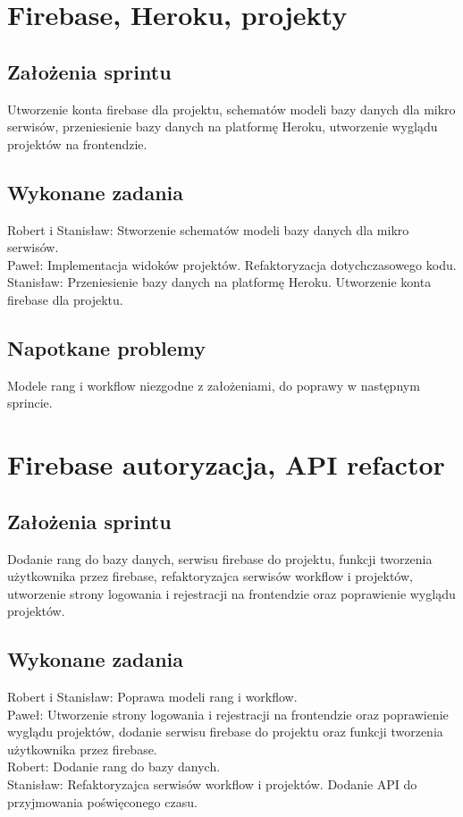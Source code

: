 \documentclass[a4paper,11pt]{report}
\begin{document}
\section {Firebase, Heroku, projekty}
\subsection {Założenia sprintu}
Utworzenie konta firebase dla projektu, schematów modeli bazy danych dla mikro serwisów, przeniesienie bazy danych na platformę Heroku, utworzenie wyglądu projektów na frontendzie.
\subsection {Wykonane zadania}
Robert i Stanisław: Stworzenie schematów modeli bazy danych dla mikro serwisów.\\
Paweł: Implementacja widoków projektów. Refaktoryzacja dotychczasowego kodu. \\
Stanisław: Przeniesienie bazy danych na platformę Heroku. Utworzenie konta firebase dla projektu.\\
\subsection {Napotkane problemy}
Modele rang i workflow niezgodne z założeniami, do poprawy w następnym sprincie.

\section {Firebase autoryzacja, API refactor}
\subsection {Założenia sprintu}
Dodanie rang do bazy danych, serwisu firebase do projektu, funkcji tworzenia użytkownika przez firebase, refaktoryzajca serwisów workflow i projektów, utworzenie strony logowania i rejestracji na frontendzie oraz poprawienie wyglądu projektów.
\subsection {Wykonane zadania}
Robert i Stanisław: Poprawa modeli rang i workflow.\\
Paweł: Utworzenie strony logowania i rejestracji na frontendzie oraz poprawienie wyglądu projektów, dodanie serwisu firebase do projektu oraz funkcji tworzenia użytkownika przez firebase.\\
Robert: Dodanie rang do bazy danych.\\
Stanisław: Refaktoryzajca serwisów workflow i projektów. Dodanie API do przyjmowania poświęconego czasu.\\
\end{document}
